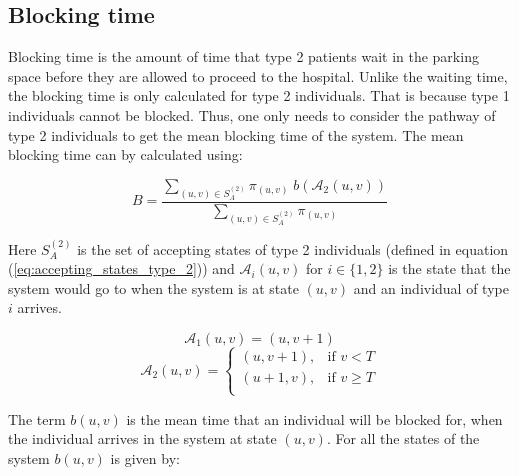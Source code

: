 \subsection{Blocking time}\label{sec:blocking_time}


Blocking time is the amount of time that type 2 patients wait in the parking 
space before they are allowed to proceed to the hospital.
Unlike the waiting time, the blocking time is only calculated for type 2 
individuals.  
That is because type 1 individuals cannot be blocked. 
Thus, one only needs to consider the pathway of type 2 individuals to get the 
mean blocking time of the system. 
The mean blocking time can by calculated using:

\begin{equation}\label{eq:algebraic_blocking_time}
    B = \frac{\sum_{(u,v) \in S_A^{(2)}} \pi_{(u,v)} \; 
    b(\mathcal{A}_2(u,v))}{\sum_{(u,v) \in S_A^{(2)}} \pi_{(u,v)}}
\end{equation}

Here \(S_A^{(2)}\) is the set of accepting states of type 2 individuals (defined
in equation (\ref{eq:accepting_states_type_2})) and \(\mathcal{A}_i(u,v)\) for
\(i \in \{1, 2\} \) is the state that the system would go to when the system is
at state \( (u,v) \) and an individual of type \(i\) arrives. 

\begin{equation}\label{eq:arriving_state_class_1}
    \mathcal{A}_1(u,v) = (u, v + 1)
\end{equation}
\begin{equation}\label{eq:arriving_state_class_2}
    \mathcal{A}_2(u,v) = 
    \begin{cases}
        (u, v + 1), & \text{if } v < T \\
        (u + 1, v), & \text{if } v \geq T \\
    \end{cases}
\end{equation}

The term \(b(u,v)\) is the mean time that an individual will be blocked for, 
when the individual arrives in the system at state \((u,v)\). 
For all the states of the system \(b(u,v)\) is given by:

